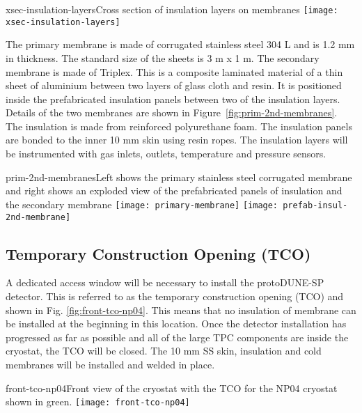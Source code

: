 \begin{cdrfigure}{xsec-insulation-layers}{Cross section of insulation layers on membranes}
  \texttt{[image: xsec-insulation-layers]}
\end{cdrfigure}


The primary membrane is made of corrugated stainless steel 304 L and is 1.2 mm in thickness.  The standard size of the sheets is 3 m x 1 m.  The secondary membrane is made of Triplex.  This is a composite laminated material of a thin sheet of aluminium between two layers of glass cloth and resin.  It is positioned inside the prefabricated insulation panels between two of the insulation layers.  Details of the two membranes are shown in Figure~\ref{fig:prim-2nd-membranes}.   The insulation is made from reinforced polyurethane foam.  The insulation panels are bonded to the inner 10 mm skin using resin ropes.  The insulation layers will be instrumented with gas inlets, outlets, temperature and pressure sensors.

\begin{cdrfigure}{prim-2nd-membranes}{Left shows the primary stainless steel corrugated membrane and right shows an exploded view of the prefabricated panels of insulation and the secondary membrane}
  \texttt{[image: primary-membrane]}
  \texttt{[image: prefab-insul-2nd-membrane]}
\end{cdrfigure}

\subsection{Temporary Construction Opening (TCO)}

A dedicated access window will be necessary to install the protoDUNE-SP detector.  This is referred to as the temporary construction opening (TCO) and shown in Fig. \ref{fig:front-tco-np04}.  This means that no insulation of membrane can be installed at the beginning in this location. Once the detector installation has progressed as far as possible and all of the large TPC components are inside the cryostat, the TCO will be closed.  The 10 mm SS skin, insulation and cold membranes will be installed and welded in place. 

\begin{cdrfigure}{front-tco-np04}{Front view of the cryostat with the TCO for the NP04 cryostat shown in green.}
  \texttt{[image: front-tco-np04]}
\end{cdrfigure}


